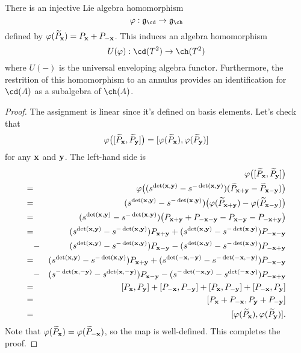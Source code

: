 \begin{proposition}
There is an injective Lie algebra homomorphism 
\[
\varphi: \mathfrak{g}_\cd \to \mathfrak{g}_\ch 
\]
defined by $\varphi(\widetilde{P}_{\mathbf{x}}) = P_{\mathbf{x}} + P_{-{\mathbf{x}}}$. This induces an algebra homomorphism
\[
U(\varphi): \cd(T^2) \to \ch(T^2)
\]
where $U(-)$ is the universal enveloping algebra functor. Furthermore, the restrition of this homomorphism to an annulus provides an identification for $\cd(A)$ as a subalgebra of $\ch(A)$.
\end{proposition}
\begin{proof}
The assignment is linear since it's defined on basis elements. Let's check that
\[
\varphi\big( [\widetilde{P}_{\mathbf{x}}, \widetilde{P}_{\mathbf{y}}] \big) = [\varphi(\widetilde{P}_{\mathbf{x}}), \varphi(\widetilde{P}_{\mathbf{y}})]
\]
for any ${\mathbf{x}}$ and ${\mathbf{y}}$. The left-hand side is
\begin{eqnarray*}
&&\varphi\big( [\widetilde{P}_{\mathbf{x}}, \widetilde{P}_{\mathbf{y}}] \big) \\
=&& \varphi\big( (s^{\det({\mathbf{x}}, {\mathbf{y}})} - s^{-\det({\mathbf{x}}, {\mathbf{y}})})(\widetilde{P}_{{\mathbf{x}}+{\mathbf{y}}} - \widetilde{P}_{{\mathbf{x}}-{\mathbf{y}}}) \big) \\
=&& (s^{\det({\mathbf{x}}, {\mathbf{y}})} - s^{-\det({\mathbf{x}}, {\mathbf{y}})}) \big( \varphi(\widetilde{P}_{{\mathbf{x}}+{\mathbf{y}}}) - \varphi(\widetilde{P}_{{\mathbf{x}}-{\mathbf{y}}}) \big) \\
=&& (s^{\det({\mathbf{x}}, {\mathbf{y}})} - s^{-\det({\mathbf{x}}, {\mathbf{y}})}) \big( P_{{\mathbf{x}}+{\mathbf{y}}} + P_{-{\mathbf{x}}-{\mathbf{y}}} - P_{{\mathbf{x}}-{\mathbf{y}}} - P_{-{\mathbf{x}}+{\mathbf{y}}} \big) \\
=&& (s^{\det({\mathbf{x}}, {\mathbf{y}})} - s^{-\det({\mathbf{x}}, {\mathbf{y}})}) P_{{\mathbf{x}}+{\mathbf{y}}} + (s^{\det({\mathbf{x}}, {\mathbf{y}})} - s^{-\det({\mathbf{x}}, {\mathbf{y}})}) P_{-{\mathbf{x}}-{\mathbf{y}}} \\
&-& (s^{\det({\mathbf{x}}, {\mathbf{y}})} - s^{-\det({\mathbf{x}}, {\mathbf{y}})}) P_{{\mathbf{x}}-{\mathbf{y}}} - (s^{\det({\mathbf{x}}, {\mathbf{y}})} - s^{-\det({\mathbf{x}}, {\mathbf{y}})}) P_{-{\mathbf{x}}+{\mathbf{y}}} \\
=&& (s^{\det({\mathbf{x}}, {\mathbf{y}})} - s^{-\det({\mathbf{x}}, {\mathbf{y}})}) P_{{\mathbf{x}}+{\mathbf{y}}} + (s^{\det(-{\mathbf{x}}, -{\mathbf{y}})} - s^{-\det(-{\mathbf{x}}, -{\mathbf{y}})}) P_{-{\mathbf{x}}-{\mathbf{y}}} \\
&-& (s^{-\det({\mathbf{x}}, -{\mathbf{y}})} - s^{\det({\mathbf{x}}, -{\mathbf{y}})}) P_{{\mathbf{x}}-{\mathbf{y}}} - (s^{-\det(-{\mathbf{x}}, {\mathbf{y}})} - s^{\det(-{\mathbf{x}}, {\mathbf{y}})}) P_{-{\mathbf{x}}+{\mathbf{y}}} \\
=&& [P_{\mathbf{x}}, P_{\mathbf{y}}] + [P_{-{\mathbf{x}}}, P_{-{\mathbf{y}}}] + [P_{{\mathbf{x}}}, P_{-{\mathbf{y}}}] + [P_{-{\mathbf{x}}}, P_{{\mathbf{y}}}] \\
=&& [P_{{\mathbf{x}}} + P_{-{\mathbf{x}}}, P_{{\mathbf{y}}} + P_{-{\mathbf{y}}}] \\
=&& [\varphi(\widetilde{P}_{\mathbf{x}}), \varphi(\widetilde{P}_{\mathbf{y}})].
\end{eqnarray*}
Note that $\varphi(\widetilde{P}_{\mathbf{x}}) = \varphi(\widetilde{P}_{-{\mathbf{x}}})$, so the map is well-defined. This completes the proof.
\end{proof}

